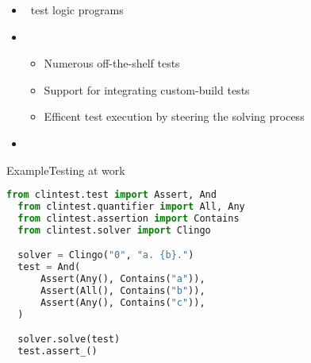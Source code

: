 \begin{frame}{\clintest}
  \begin{itemize}
  \item {} \ test logic programs
  \item {}
    \begin{itemize}
    \item Numerous off-the-shelf tests
    \item Support for integrating custom-build tests
    \item Efficent test execution by steering the solving process
    \end{itemize}
  \item {} \ \clingo
  \end{itemize}
\end{frame}
\begin{frame}[fragile]{Example}{Testing at work}
  \begin{lstlisting}[language=python,basicstyle=\small\ttfamily]
  from clintest.test import Assert, And
  from clintest.quantifier import All, Any
  from clintest.assertion import Contains
  from clintest.solver import Clingo

  solver = Clingo("0", "a. {b}.")
  test = And(
      Assert(Any(), Contains("a")),
      Assert(All(), Contains("b")),
      Assert(Any(), Contains("c")),
  )

  solver.solve(test)
  test.assert_()
  \end{lstlisting}
  \end{frame}
%
